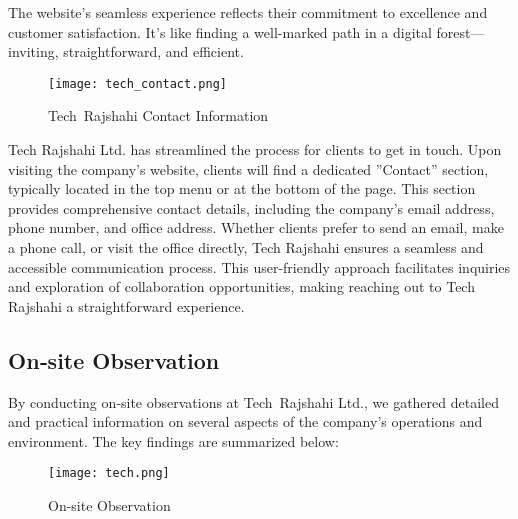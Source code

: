 \documentclass[12pt,a4paper]{article}
\begin{document}
The website’s seamless experience reflects their commitment to excellence and customer satisfaction. It’s like finding a well-marked path in a digital forest—inviting, straightforward, and efficient.

\begin{figure}[H]
    \centering
    \texttt{[image: tech\_contact.png]}
    \caption{Tech Rajshahi Contact Information}
    \label{fig:tech_contact}
\end{figure}

Tech Rajshahi Ltd. has streamlined the process for clients to get in touch. Upon visiting the
company’s website, clients will find a dedicated ”Contact” section, typically located in the top
menu or at the bottom of the page. This section provides comprehensive contact details, including
the company’s email address, phone number, and office address. Whether clients prefer to send
an email, make a phone call, or visit the office directly, Tech Rajshahi ensures a seamless and
accessible communication process. This user-friendly approach facilitates inquiries and exploration
of collaboration opportunities, making reaching out to Tech Rajshahi a straightforward experience.

\subsection{On‑site Observation}
By conducting on‑site observations at Tech Rajshahi Ltd., we gathered detailed and practical information on several aspects of the company’s operations and environment.  The key findings are summarized below:

\begin{figure}[H]
    \centering
    \texttt{[image: tech.png]}
    \caption{On-site Observation}
    \label{fig:tech_contact}
\end{figure}
\end{document}
